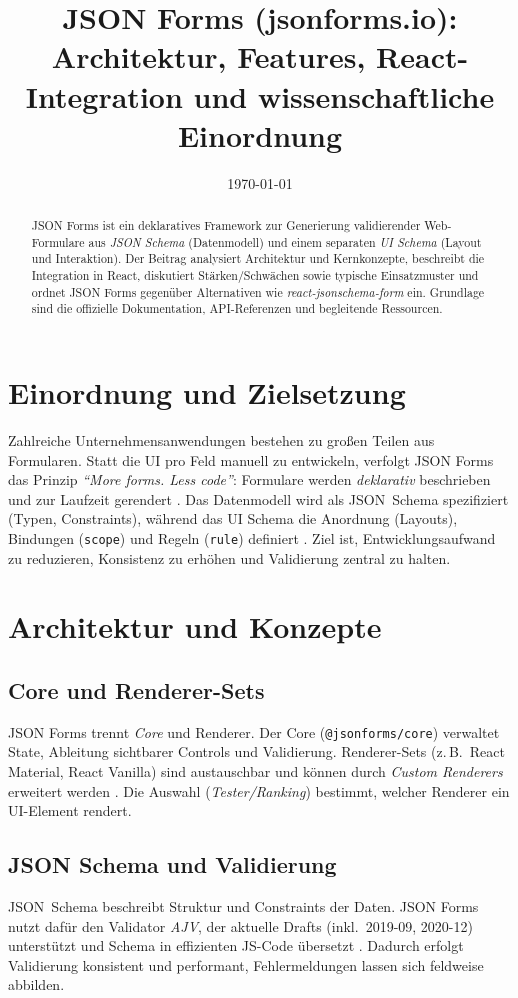 \documentclass[11pt,a4paper]{article}
\title{JSON Forms (jsonforms.io): Architektur, Features, React-Integration und wissenschaftliche Einordnung}
\author{ }
\date{\today}
\begin{document}
\maketitle

\begin{abstract}
\noindent
JSON Forms ist ein deklaratives Framework zur Generierung validierender Web-Formulare aus \emph{JSON Schema} (Datenmodell) und einem separaten \emph{UI Schema} (Layout und Interaktion). Der Beitrag analysiert Architektur und Kernkonzepte, beschreibt die Integration in React, diskutiert St\"arken/Schw\"achen sowie typische Einsatzmuster und ordnet JSON Forms gegen\"uber Alternativen wie \emph{react-jsonschema-form} ein. Grundlage sind die offizielle Dokumentation, API-Referenzen und begleitende Ressourcen.
\end{abstract}

\section{Einordnung und Zielsetzung}
Zahlreiche Unternehmens\-anwendungen bestehen zu gro{\ss}en Teilen aus Formularen. Statt die UI pro Feld manuell zu entwickeln, verfolgt JSON Forms das Prinzip \emph{``More forms. Less code''}: Formulare werden \emph{deklarativ} beschrieben und zur Laufzeit gerendert \cite{jsonforms-site,jsonforms-what}. Das Datenmodell wird als JSON~Schema spezifiziert (Typen, Constraints), w\"ahrend das UI Schema die Anordnung (Layouts), Bindungen (\texttt{scope}) und Regeln (\texttt{rule}) definiert \cite{jsonforms-uischema,jsonforms-rules}. Ziel ist, Entwicklungsaufwand zu reduzieren, Konsistenz zu erh\"ohen und Validierung zentral zu halten.

\section{Architektur und Konzepte}
\subsection{Core und Renderer-Sets}
JSON Forms trennt \emph{Core} und Renderer. Der Core (\texttt{@jsonforms/core}) verwaltet State, Ableitung sichtbarer Controls und Validierung. Renderer-Sets (z.\,B.\ React Material, React Vanilla) sind austauschbar und k\"onnen durch \emph{Custom Renderers} erweitert werden \cite{jsonforms-core,jsonforms-material}. Die Auswahl (\emph{Tester/Ranking}) bestimmt, welcher Renderer ein UI-Element rendert.

\subsection{JSON Schema und Validierung}
JSON~Schema beschreibt Struktur und Constraints der Daten. JSON Forms nutzt daf\"ur den Validator \emph{AJV}, der aktuelle Drafts (inkl.\ 2019-09, 2020-12) unterst\"utzt und Schema in effizienten JS-Code \"ubersetzt \cite{ajv-site,ajv-guide}. Dadurch erfolgt Validierung konsistent und performant, Fehlermeldungen lassen sich feldweise abbilden.
\end{document}
